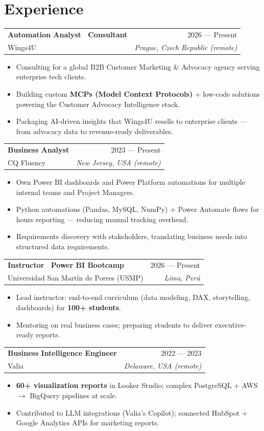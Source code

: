 \documentclass[10pt,letterpaper]{article}
\makeatletter
\newcommand{\jobheader}[4]{%
  \noindent\begin{tabularx}{\linewidth}{@{}X r@{}}
    \textbf{\color{ink}\small #1} & \textcolor{inkmute}{\footnotesize #3} \\[-1pt]
    \textcolor{inkdim}{\footnotesize #2} & \textcolor{inkmute}{\footnotesize\itshape #4}
  \end{tabularx}\par\vspace{1pt}
}
\makeatother
\begin{document}
\section*{Experience}

\jobheader{Automation Analyst \textperiodcentered\ Consultant}{Wings4U}{2026 --- Present}{Prague, Czech Republic (remote)}
\begin{itemize}\footnotesize
  \item Consulting for a global B2B Customer Marketing \& Advocacy agency serving enterprise tech clients.
  \item Building custom \textbf{MCPs (Model Context Protocols)} + low-code solutions powering the Customer Advocacy Intelligence stack.
  \item Packaging AI-driven insights that Wings4U resells to enterprise clients --- from advocacy data to revenue-ready deliverables.
\end{itemize}

\jobheader{Business Analyst}{CQ Fluency}{2023 --- Present}{New Jersey, USA (remote)}
\begin{itemize}\footnotesize
  \item Own Power BI dashboards and Power Platform automations for multiple internal teams and Project Managers.
  \item Python automations (Pandas, MySQL, NumPy) + Power Automate flows for hours reporting --- reducing manual tracking overhead.
  \item Requirements discovery with stakeholders, translating business needs into structured data requirements.
\end{itemize}

\jobheader{Instructor \textperiodcentered\ Power BI Bootcamp}{Universidad San Martín de Porres (USMP)}{2026 --- Present}{Lima, Perú}
\begin{itemize}\footnotesize
  \item Lead instructor: end-to-end curriculum (data modeling, DAX, storytelling, dashboards) for \textbf{100+ students}.
  \item Mentoring on real business cases; preparing students to deliver executive-ready reports.
\end{itemize}

\jobheader{Business Intelligence Engineer}{Valia}{2022 --- 2023}{Delaware, USA (remote)}
\begin{itemize}\footnotesize
  \item \textbf{60+ visualization reports} in Looker Studio; complex PostgreSQL + AWS $\rightarrow$ BigQuery pipelines at scale.
  \item Contributed to LLM integrations (Valia's Copilot); connected HubSpot + Google Analytics APIs for marketing reports.
\end{itemize}
\end{document}
